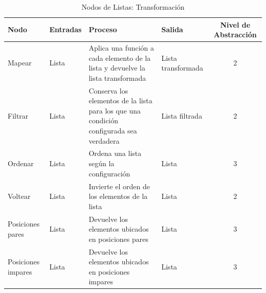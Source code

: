 \begin{table}[H]
    \centering
    \caption{Nodos de Listas: Transformación}
    \begin{tabularx}{\textwidth}{ l l X X c }
        \hline
        \textbf{Nodo}      & \textbf{Entradas} & \textbf{Proceso}                                                                        & \textbf{Salida}    & \textbf{Nivel de Abstracción} \\ \hline
        Mapear             & Lista             & Aplica una función a cada elemento de la lista y devuelve la lista transformada         & Lista transformada & 2                             \\
        Filtrar            & Lista             & Conserva los elementos de la lista para los que una condición configurada sea verdadera & Lista filtrada     & 2                             \\
        Ordenar            & Lista             & Ordena una lista según la configuración                                                 & Lista              & 3                             \\
        Voltear            & Lista             & Invierte el orden de los elementos de la lista                                          & Lista              & 2                             \\
        Posiciones pares   & Lista             & Devuelve los elementos ubicados en posiciones pares                                     & Lista              & 3                             \\
        Posiciones impares & Lista             & Devuelve los elementos ubicados en posiciones impares                                   & Lista              & 3                             \\
        \hline
    \end{tabularx}
\end{table}

